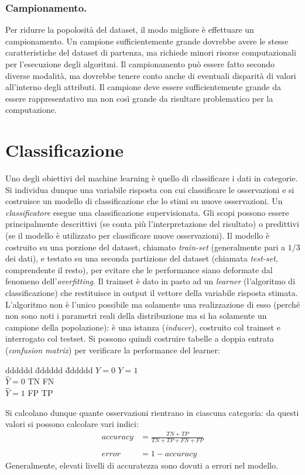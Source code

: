 \documentclass[11pt, a4page, twocolumn]{article}
\begin{document}
\section{Campionamento.}
Per ridurre la popolosità del dataset, il modo migliore è effettuare un campionamento.
Un campione sufficientemente grande dovrebbe avere le stesse caratteristiche del dataset di partenza, ma richiede minori risorse computazionali per l'esecuzione degli algoritmi.
Il campionamento può essere fatto secondo diverse modalità, ma dovrebbe tenere conto anche di eventuali disparità di valori all'interno degli attributi.
Il campione deve essere sufficientemente grande da essere rappresentativo ma non così grande da risultare problematico per la computazione.



\newpage
\part{Classificazione}
Uno degli obiettivi del machine learning è quello di classificare i dati in categorie.
Si individua dunque una variabile risposta con cui classificare le osservazioni e si costruisce un modello di classificazione che lo stimi su nuove osservazioni.
Un \textit{classificatore} esegue una classificazione supervisionata.
Gli scopi possono essere principalmente descrittivi (se conta più l'interpretazione del risultato) o predittivi (se il modello è utilizzato per classificare nuove osservazioni).
Il modello è costruito su una porzione del dataset, chiamato \textit{train-set} (generalmente pari a $1/3$ dei dati), e testato su una seconda partizione del dataset (chiamata \textit{test-set}, comprendente il resto), per evitare che le performance siano deformate dal fenomeno dell'\textit{overfitting}.
Il trainset è dato in pasto ad un \textit{learner} (l'algoritmo di classificazione) che restituisce in output il vettore della variabile risposta stimata.
L'algoritmo non è l'unico possibile ma solamente una realizzazione di esso (perché non sono noti i parametri reali della distribuzione ma si ha solamente un campione della popolazione): è una istanza (\textit{inducer}), costruito col trainset e interrogato col testset.
Si possono quindi costruire tabelle a doppia entrata (\textit{confusion matrix}) per verificare la performance del learner:
\begin{tabbing}
  dddddd \= dddddd \= dddddd \kill
              \> $Y=0$ \> $Y=1$   \\
  $\hat{Y}=0$ \> TN    \> FN      \\
  $\hat{Y}=1$ \> FP    \> TP      \\
\end{tabbing}
Si calcolano dunque quante osservazioni rientrano in ciascuna categoria: da questi valori si possono calcolare vari indici:
\begin{align*}
  accuracy &= \frac{TN + TP}{TN + TP + FN + FP} \\  \\
  error &= 1 - accuracy
\end{align*}
Generalmente, elevati livelli di accuratezza sono dovuti a errori nel modello.
\end{document}

